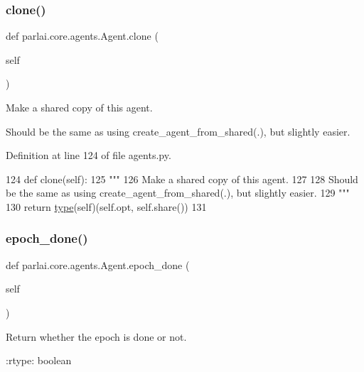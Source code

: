 \subsubsection{\texorpdfstring{clone()}{clone()}}
{\footnotesize\ttfamily def parlai.\+core.\+agents.\+Agent.\+clone (\begin{DoxyParamCaption}\item[{}]{self }\end{DoxyParamCaption})}

\begin{DoxyVerb}Make a shared copy of this agent.

Should be the same as using create_agent_from_shared(.), but slightly easier.
\end{DoxyVerb}
 

Definition at line 124 of file agents.\+py.


\begin{DoxyCode}
124     \textcolor{keyword}{def }clone(self):
125         \textcolor{stringliteral}{"""}
126 \textcolor{stringliteral}{        Make a shared copy of this agent.}
127 \textcolor{stringliteral}{}
128 \textcolor{stringliteral}{        Should be the same as using create\_agent\_from\_shared(.), but slightly easier.}
129 \textcolor{stringliteral}{        """}
130         \textcolor{keywordflow}{return} \hyperlink{namespaceparlai_1_1agents_1_1tfidf__retriever_1_1build__tfidf_ad5dfae268e23f506da084a9efb72f619}{type}(self)(self.opt, self.share())
131 
\end{DoxyCode}
\mbox{\label{classparlai_1_1core_1_1agents_1_1Agent_a40157e237ea85d75ebc3fd248c7a1a1b}} 
\subsubsection{\texorpdfstring{epoch\+\_\+done()}{epoch\_done()}}
{\footnotesize\ttfamily def parlai.\+core.\+agents.\+Agent.\+epoch\+\_\+done (\begin{DoxyParamCaption}\item[{}]{self }\end{DoxyParamCaption})}

\begin{DoxyVerb}Return whether the epoch is done or not.

:rtype: boolean
\end{DoxyVerb}
 

